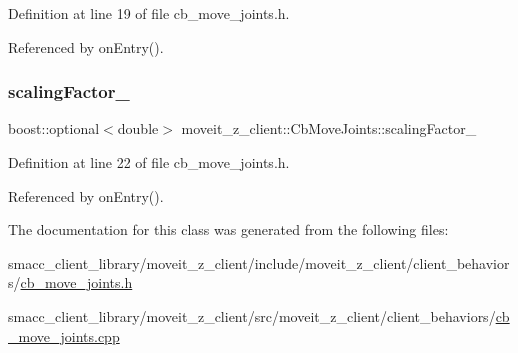 Definition at line 19 of file cb\+\_\+move\+\_\+joints.\+h.



Referenced by on\+Entry().

\mbox{\label{classmoveit__z__client_1_1CbMoveJoints_aadb5410711e277fab3a637cb4835fb3b}} 
\subsubsection{\texorpdfstring{scaling\+Factor\+\_\+}{scalingFactor\_}}
{\footnotesize\ttfamily boost\+::optional$<$double$>$ moveit\+\_\+z\+\_\+client\+::\+Cb\+Move\+Joints\+::scaling\+Factor\+\_\+}



Definition at line 22 of file cb\+\_\+move\+\_\+joints.\+h.



Referenced by on\+Entry().



The documentation for this class was generated from the following files\+:\begin{DoxyCompactItemize}
\item 
smacc\+\_\+client\+\_\+library/moveit\+\_\+z\+\_\+client/include/moveit\+\_\+z\+\_\+client/client\+\_\+behaviors/\hyperlink{cb__move__joints_8h}{cb\+\_\+move\+\_\+joints.\+h}\item 
smacc\+\_\+client\+\_\+library/moveit\+\_\+z\+\_\+client/src/moveit\+\_\+z\+\_\+client/client\+\_\+behaviors/\hyperlink{cb__move__joints_8cpp}{cb\+\_\+move\+\_\+joints.\+cpp}\end{DoxyCompactItemize}
